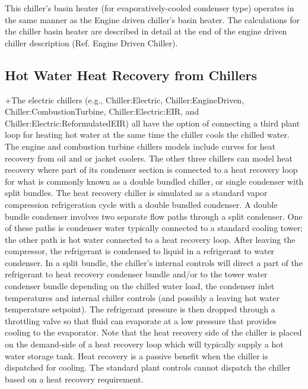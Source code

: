 This chiller's basin heater (for evaporatively-cooled condenser type) operates in the same manner as the Engine driven chiller's basin heater. The calculations for the chiller basin heater are described in detail at the end of the engine driven chiller description (Ref. Engine Driven Chiller).

\subsection{Hot Water Heat Recovery from Chillers}\label{hot-water-heat-recovery-from-chillers}

+The electric chillers (e.g., Chiller:Electric, Chiller:EngineDriven, Chiller:CombustionTurbine, Chiller:Electric:EIR, and Chiller:Electric:ReformulatedEIR) all have the option of connecting a third plant loop for heating hot water at the same time the chiller cools the chilled water. The engine and combustion turbine chillers models include curves for heat recovery from oil and or jacket coolers. The other three chillers can model heat recovery where part of its condenser section is connected to a heat recovery loop for what is commonly known as a double bundled chiller, or single condenser with split bundles. The heat recovery chiller is simulated as a standard vapor compression refrigeration cycle with a double bundled condenser. A double bundle condenser involves two separate flow paths through a split condenser. One of these paths is condenser water typically connected to a standard cooling tower; the other path is hot water connected to a heat recovery loop. After leaving the compressor, the refrigerant is condensed to liquid in a refrigerant to water condenser. In a split bundle, the chiller's internal controls will direct a part of the refrigerant to heat recovery condenser bundle and/or to the tower water condenser bundle depending on the chilled water load, the condenser inlet temperatures and internal chiller controls (and possibly a leaving hot water temperature setpoint). The refrigerant pressure is then dropped through a throttling valve so that fluid can evaporate at a low pressure that provides cooling to the evaporator. Note that the heat recovery side of the chiller is placed on the demand-side of a heat recovery loop which will typically supply a hot water storage tank. Heat recovery is a passive benefit when the chiller is dispatched for cooling. The standard plant controls cannot dispatch the chiller based on a heat recovery requirement.

